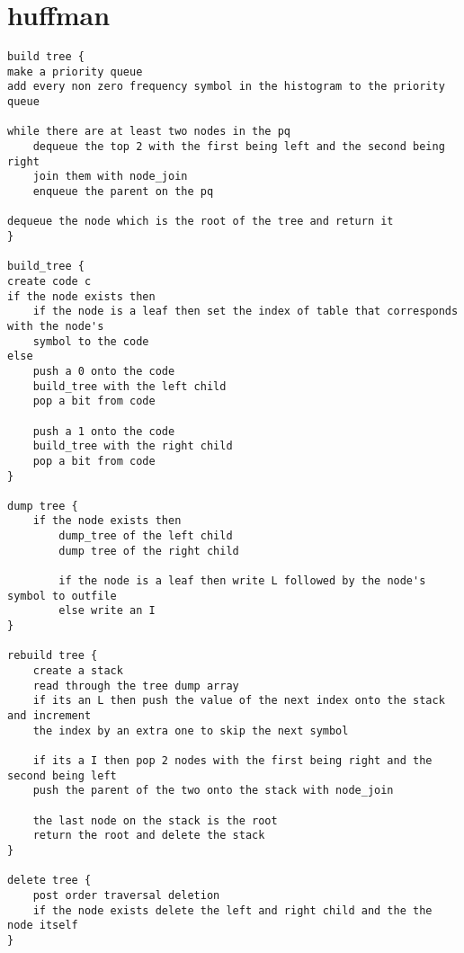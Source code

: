 \documentclass[11pt]{article}
\begin{document}
\section{huffman}
\begin{verbatim}
build tree {
make a priority queue
add every non zero frequency symbol in the histogram to the priority queue

while there are at least two nodes in the pq
    dequeue the top 2 with the first being left and the second being right
    join them with node_join
    enqueue the parent on the pq

dequeue the node which is the root of the tree and return it
}

build_tree {
create code c
if the node exists then
    if the node is a leaf then set the index of table that corresponds with the node's
    symbol to the code
else 
    push a 0 onto the code
    build_tree with the left child
    pop a bit from code
    
    push a 1 onto the code
    build_tree with the right child
    pop a bit from code
}

dump tree {
    if the node exists then
        dump_tree of the left child
        dump tree of the right child
        
        if the node is a leaf then write L followed by the node's symbol to outfile
        else write an I
}

rebuild tree {
    create a stack
    read through the tree dump array
    if its an L then push the value of the next index onto the stack and increment
    the index by an extra one to skip the next symbol
    
    if its a I then pop 2 nodes with the first being right and the second being left
    push the parent of the two onto the stack with node_join
    
    the last node on the stack is the root
    return the root and delete the stack
}

delete tree {
    post order traversal deletion
    if the node exists delete the left and right child and the the node itself
}
\end{verbatim}
\end{document}
